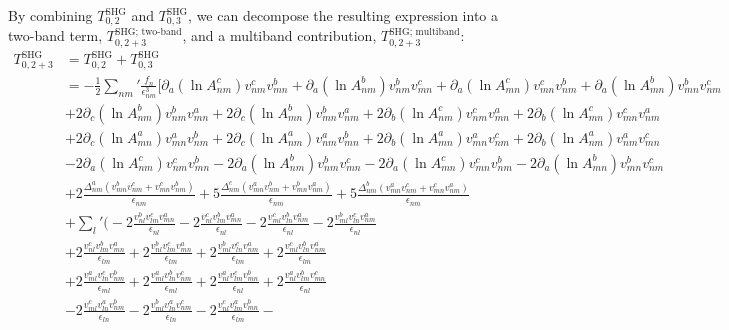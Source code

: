 \documentclass[twocolumn, prx, reprint, amsfonts, amsmath, amssymb, longbibliography, floatfix, aps]{revtex4-2}
\begin{document}
By combining $T^{\text{SHG}}_{0, 2}$ and $T^{\text{SHG}}_{0, 3}$, we can decompose the resulting expression into a two-band term, $T^{\text{SHG; two-band}}_{0, 2+3}$, and a multiband contribution, $T^{\text{SHG; multiband}}_{0, 2+3}$:
\begin{equation}
	\begin{aligned}
		T^{\text{SHG}}_{0, 2+3} &= T^{\text{SHG}}_{0, 2} + T^{\text{SHG}}_{0, 3} \\
		&=- \frac{1}{2} {\textstyle \sum_{nm}'} \frac{f_n}{\epsilon^3_{nm}}\Big[\partial_a(\ln A^{c}_{nm}) v^c_{nm} v^{b}_{mn} + \partial_a(\ln A^{b}_{nm}) v^b_{nm} v^{c}_{mn} + \partial_a(\ln A^{c}_{mn}) v^c_{mn} v^{b}_{nm} + \partial_a(\ln A^{b}_{mn}) v^b_{mn} v^{c}_{nm} \\
		&+ 2\partial_c(\ln A^{b}_{nm}) v^b_{nm} v^{a}_{mn} + 2\partial_c(\ln A^{b}_{mn}) v^b_{mn} v^{a}_{nm} + 2\partial_b(\ln A^{c}_{nm}) v^c_{nm} v^{a}_{mn} + 2\partial_b(\ln A^{c}_{mn}) v^c_{mn} v^{a}_{nm}\\
		&+2\partial_c(\ln A^{a}_{mn}) v^a_{mn} v^{b}_{nm} + 2\partial_c(\ln A^{a}_{nm}) v^a_{nm} v^{b}_{mn} + 2\partial_b(\ln A^{a}_{mn}) v^a_{mn} v^{c}_{nm} + 2\partial_b(\ln A^{a}_{nm}) v^a_{nm} v^{c}_{mn} \\
		&-2\partial_a(\ln A^{c}_{nm}) v^c_{nm} v^{b}_{mn} - 2\partial_a(\ln A^{b}_{nm}) v^b_{nm} v^{c}_{mn} - 2\partial_a(\ln A^{c}_{mn}) v^c_{mn} v^{b}_{nm} - 2\partial_a(\ln A^{b}_{mn}) v^b_{mn} v^{c}_{nm} \\
		& + 2\frac{\Delta_{nm}^a (v^b_{mn}v^c_{nm} + v^c_{mn}v^b_{nm})}{\epsilon_{nm}} + 5\frac{\Delta_{nm}^c (v^a_{mn}v^b_{nm} + v^b_{mn}v^a_{nm})}{\epsilon_{nm}} + 5\frac{\Delta_{nm}^b (v^a_{mn}v^c_{nm} + v^c_{mn}v^a_{nm})}{\epsilon_{nm}} \\
		&+ {\textstyle \sum_{l}'} \Big(-2\frac{v^b_{nl}v^c_{lm}v^a_{mn}}{\epsilon_{nl}} - 2\frac{v^c_{nl}v^b_{lm}v^a_{mn}}{\epsilon_{nl}} -
		2\frac{v^c_{ml}v^b_{ln}v^a_{nm}}{\epsilon_{nl}} - 
		2\frac{v^b_{ml}v^c_{ln}v^a_{nm}}{\epsilon_{nl}}  \\
		&+ 2\frac{v^c_{nl}v^b_{lm}v^a_{mn}}{\epsilon_{lm}} + 2\frac{v^b_{nl}v^c_{lm}v^a_{mn}}{\epsilon_{lm}} +
		2\frac{v^b_{ml}v^c_{ln}v^a_{nm}}{\epsilon_{lm}} + 
		2\frac{v^c_{ml}v^b_{ln}v^a_{nm}}{\epsilon_{lm}} \\
		&+ 2\frac{v^a_{ml}v^c_{ln}v^b_{nm}}{\epsilon_{ml}} + 2\frac{v^a_{ml}v^b_{ln}v^c_{nm}}{\epsilon_{ml}} + 2\frac{v^a_{nl}v^c_{lm}v^b_{mn}}{\epsilon_{nl}} +
		2\frac{v^a_{nl}v^b_{lm}v^c_{mn}}{\epsilon_{nl}} \\
		&- 2\frac{v^c_{ml}v^a_{ln}v^b_{nm}}{\epsilon_{ln}} - 2\frac{v^b_{ml}v^a_{ln}v^c_{nm}}{\epsilon_{ln}} - 2\frac{v^c_{nl}v^a_{lm}v^b_{mn}}{\epsilon_{lm}} -

\end{aligned}
\end{equation}
\end{document}
